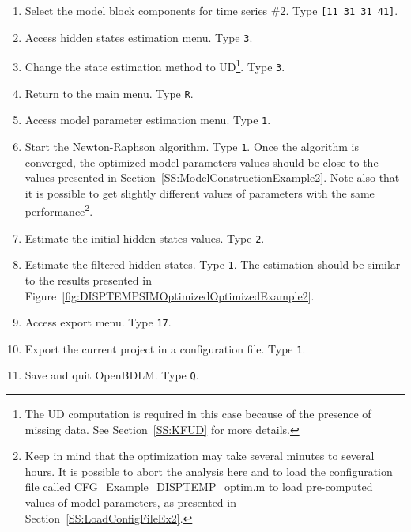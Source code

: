 \begin{enumerate}
\item Select the model block components for time series \#2. Type \colorbox{light-gray}{\lstinline[basicstyle = \mlttfamily \small, backgroundcolor = \color{light-gray}]![11 31 31 41]!}.
\item Access hidden states estimation menu. Type \colorbox{light-gray}{\lstinline[basicstyle = \mlttfamily \small, backgroundcolor = \color{light-gray}]!3!}. 
\item Change the state estimation method to UD\footnote{The UD computation is required in this case because of the presence of missing data. See Section~\ref{SS:KFUD} for more details.}. Type \colorbox{light-gray}{\lstinline[basicstyle = \mlttfamily \small, backgroundcolor = \color{light-gray}]!3!}. 
\item Return to the main menu. Type \colorbox{light-gray}{\lstinline[basicstyle = \mlttfamily \small, backgroundcolor = \color{light-gray}]!R!}.
\item Access model parameter estimation menu. Type \colorbox{light-gray}{\lstinline[basicstyle = \mlttfamily \small, backgroundcolor = \color{light-gray}]!1!}. 
\item Start the Newton-Raphson algorithm. Type \colorbox{light-gray}{\lstinline[basicstyle = \mlttfamily \small, backgroundcolor = \color{light-gray}]!1!}. Once the algorithm is converged, the optimized model parameters values should be close to the values presented in Section~\ref{SS:ModelConstructionExample2}. Note also that it is possible to get slightly different values of parameters with the same performance\footnote{Keep in mind that the optimization may take several minutes to several hours. It is possible to abort the analysis here and to load the configuration file called CFG\_Example\_DISPTEMP\_optim.m to load pre-computed values of model parameters, as presented in Section~\ref{SS:LoadConfigFileEx2}.}.
\item Estimate the initial hidden states values. Type \colorbox{light-gray}{\lstinline[basicstyle = \mlttfamily \small, backgroundcolor = \color{light-gray}]!2!}.
\item Estimate the filtered hidden states. Type \colorbox{light-gray}{\lstinline[basicstyle = \mlttfamily \small, backgroundcolor = \color{light-gray}]!1!}. The estimation should be similar to the results presented in Figure~\ref{fig:DISPTEMPSIMOptimizedOptimizedExample2}.
\item Access export menu. Type \colorbox{light-gray}{\lstinline[basicstyle = \mlttfamily \small, backgroundcolor = \color{light-gray}]!17!}. 
\item Export the current project in a configuration file. Type \colorbox{light-gray}{\lstinline[basicstyle = \mlttfamily \small, backgroundcolor = \color{light-gray}]!1!}.
\item Save and quit OpenBDLM. Type \colorbox{light-gray}{\lstinline[basicstyle = \mlttfamily \small, backgroundcolor = \color{light-gray}]!Q!}.
\end{enumerate}




